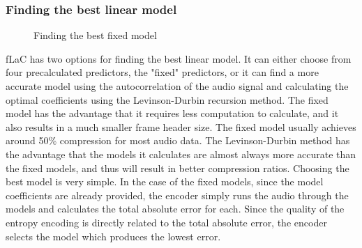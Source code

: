 \documentclass[12pt]{scrartcl}
\begin{document}
  \subsubsection*{Finding the best linear model}
  \begin{figure}[H]
    \caption{Finding the best fixed model}
    \label{fig:fixed_optimisation}
  \end{figure}
  fLaC has two options for finding the best linear model. It can either choose from four precalculated predictors, the "fixed" predictors, or it can find a more accurate model using the autocorrelation of the audio signal and calculating the optimal coefficients using the Levinson-Durbin recursion method\cite{levinson_durbin}. The fixed model has the advantage that it requires less computation to calculate, and it also results in a much smaller frame header size. The fixed model usually achieves around 50\% compression for most audio data. The Levinson-Durbin method has the advantage that the models it calculates are almost always more accurate than the fixed models, and thus will result in better compression ratios. Choosing the best model is very simple. In the case of the fixed models, since the model coefficients are already provided, the encoder simply runs the audio through the models and calculates the total absolute error for each. Since the quality of the entropy encoding is directly related to the total absolute error, the encoder selects the model which produces the lowest error. 
  
\end{document}
